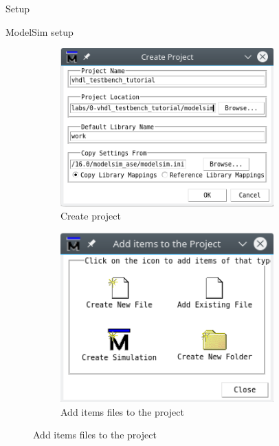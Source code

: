 \documentclass[lab]{course}
\begin{document}
\begin{section}{Setup}
\begin{subsection}{ModelSim setup}
\begin{enumerate}
                \begin{figure}[!h]
                    \centering
                    \begin{subfigure}[t]{0.45\textwidth}
                        \centering
                        \includegraphics[width=0.9\textwidth]{figs/create_project.png}
                        \caption{Create project}
                        \label{fig:create_project}
                    \end{subfigure}
                    \hspace{1em}
                    \begin{subfigure}[t]{0.40\textwidth}
                        \centering
                        \includegraphics[width=0.9\textwidth]{figs/add_files_to_project.png}
                        \caption{Add items files to the project}
                        \label{fig:add_files_to_project}

\end{subfigure}
\end{figure}
\end{enumerate}
\end{subsection}
\end{section}
\end{document}
